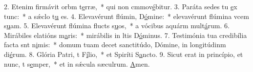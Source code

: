 2. Etenim firmávit orbm t\uline{e}rræ,~* qui non cmmov\uline{é}bitur.
3. Paráta sedes tu \uline{e}x tunc:~* a sǽclo t\uline{u} es.
4. Elevavérunt flúmin, D\uline{ó}mine:~* elevavérunt flúmina vcem s\uline{u}am.
5. Elevavérunt flúmina flucts s\uline{u}os,~* a vócibus aquárm mult\uline{á}rum.
6. Mirábiles elatións m\uline{a}ris:~* mirábilis in ltis D\uline{ó}minus.
7. Testimónia tua credibília facta snt n\uline{i}mis:~* domum tuam decet sanctitúdo, Dómine, in longitúdinm di\uline{é}rum.
8. Glória Patri, t F\uline{í}lio,~* et Spiríti S\uline{a}ncto.
9. Sicut erat in princípio, et nunc, t s\uline{e}mper,~* et in sǽcula sæculrum. \uline{A}men.
